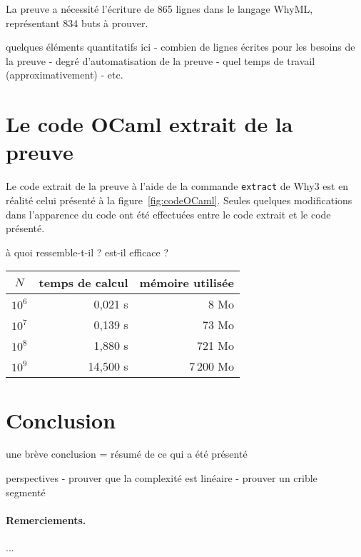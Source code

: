\documentclass[a4paper]{easychair}
\begin{document}
La preuve a nécessité l'écriture de 865 lignes dans le langage WhyML,
représentant 834 buts à prouver.


quelques éléments quantitatifs ici
- combien de lignes écrites pour les besoins de la preuve
- degré d'automatisation de la preuve
- quel temps de travail (approximativement)
- etc.

\section{Le code OCaml extrait de la preuve}

Le code extrait de la preuve à l'aide de la commande \texttt{extract} de Why3
est en réalité celui présenté à la figure~\ref{fig:codeOCaml}.
Seules quelques modifications dans l'apparence du code ont été effectuées
entre le code extrait et le code présenté.

à quoi ressemble-t-il ?
est-il efficace ?

\begin{center}
  \begin{tabular}{|c|r|r|}
    \hline
    $N$ & temps de calcul & mémoire utilisée \\
    \hline\hline
    $10^6$ &  0,021 s &      8 Mo \\\hline
    $10^7$ &  0,139 s &     73 Mo \\\hline
    $10^8$ &  1,880 s &    721 Mo \\\hline
    $10^9$ & 14,500 s & 7\,200 Mo \\\hline
  \end{tabular}
\end{center}

\section{Conclusion}
\label{sec:conclusion}

une brève conclusion = résumé de ce qui a été présenté

perspectives
- prouver que la complexité est linéaire
- prouver un crible segmenté~\cite{crible-segmente}


\paragraph{Remerciements.} ...



\end{document}
